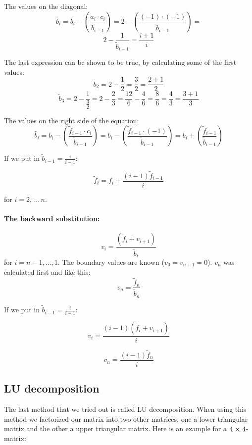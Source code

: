 \hspace{1cm}\linebreak
The values on the diagonal:
\[
\tilde{b_i} =  b_i - \left(\frac{a_i \cdot c_i}{\tilde{b}_{i-1}}\right) = 2 - \left(\frac{(-1) \cdot (-1)}{\tilde{b}_{i-1}}\right) = 
\]
\[
2 - \frac{1}{\tilde{b}_{i-1}} =  \frac{i + 1}{i}
\]

The last expression can be shown to be true, by calculating some of the first values:
\[
\tilde{b}_2 = 2 - \frac{1}{2} = \frac{3}{2} = \frac{2 + 1}{2}
\]
\[
\tilde{b}_3 = 2 - \frac{1}{\frac{3}{2}} = 2 - \frac{2}{3} = \frac{12}{6} - \frac{4}{6} = \frac{8}{6} = \frac{4}{3} = \frac{3+1}{3}
\]

The values on the right side of the equation:
\[
\tilde{b_i} =  b_i - \left(\frac{\tilde{f}_{i-1} \cdot c_i}{\tilde{b}_{i-1}}\right) = b_i - \left(\frac{\tilde{f}_{i-1} \cdot (-1)}{\tilde{b}_{i-1}}\right) = b_i + \left(\frac{\tilde{f}_{i-1}}{\tilde{b}_{i-1}}\right)
\]

If we put in $\tilde{b}_{i-1} = \frac{i}{i-1}$:

\[
\tilde{f}_i = f_i + \frac{(i-1)\tilde{f}_{i-1}}{i}
\]

for $i = 2,\, \dots\, n $.

\paragraph{The backward substitution:\hspace{4cm}}

\hspace{1cm}\linebreak
\[
v_i = \frac{\left(\tilde{f}_i + v_{i+1}\right)}{\tilde{b}_i}
\]
for $i = n-1, \dots, 1 $. The boundary values are known ($v_0 = v_{n+1} = 0$). $v_{n}$ was calculated first and like this:
\[
v_{n} = \frac{\tilde{f}_{n}}{\tilde{b}_{n}}
\]

If we put in $\tilde{b}_{i-1} = \frac{i}{i-1}$:

\[
v_{i} = \frac{(i-1)(\tilde{f}_i + v_{i+1})}{i}
\]

\[
v_n = \frac{(i-1)\tilde{f}_n}{i}
\]


\subsection{LU decomposition}


The last method that we tried out is called LU decomposition. When using this method we factorized our matrix into two other matrices, one a lower triangular matrix and the other a upper triangular matrix. Here is an example for a $ 4 \cross 4$-matrix:

